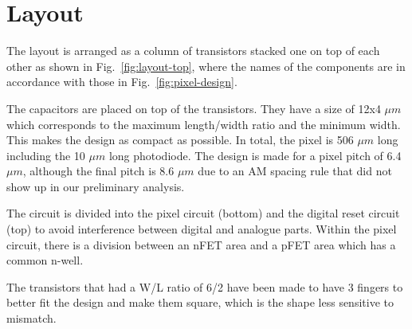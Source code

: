 \section{Layout}

The layout is arranged as a column of transistors stacked one on top of each other as shown in Fig.~\ref{fig:layout-top}, where the names of the components are in accordance with those in Fig.~\ref{fig:pixel-design}. 

The capacitors are placed on top of the transistors. They have a size of 12x4 $\mu m$ which corresponds to the maximum length/width ratio and the minimum width. This makes the design as compact as possible. In total, the pixel is 506 $\mu m$ long including the 10 $\mu m$ long photodiode. The design is made for a pixel pitch of 6.4 $\mu m$, although the final pitch is 8.6 $\mu m$ due to an AM spacing rule that did not show up in our preliminary analysis. 

The circuit is divided into the pixel circuit (bottom) and the digital reset circuit (top) to avoid interference between digital and analogue parts. Within the pixel circuit, there is a division between an nFET area and a pFET area which has a common n-well.

The transistors that had a W/L ratio of 6/2 have been made to have 3 fingers to better fit the design and make them square, which is the shape less sensitive to mismatch. 

